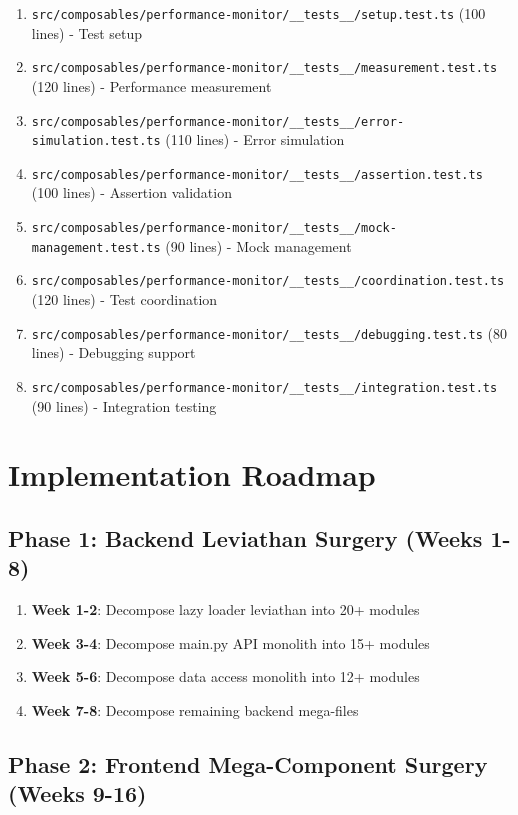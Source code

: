 \documentclass[11pt]{article}
\begin{document}
\begin{enumerate}
\item \texttt{src/composables/performance-monitor/\_\_tests\_\_/setup.test.ts} (100 lines) - Test setup
\item \texttt{src/composables/performance-monitor/\_\_tests\_\_/measurement.test.ts} (120 lines) - Performance measurement
\item \texttt{src/composables/performance-monitor/\_\_tests\_\_/error-simulation.test.ts} (110 lines) - Error simulation
\item \texttt{src/composables/performance-monitor/\_\_tests\_\_/assertion.test.ts} (100 lines) - Assertion validation
\item \texttt{src/composables/performance-monitor/\_\_tests\_\_/mock-management.test.ts} (90 lines) - Mock management
\item \texttt{src/composables/performance-monitor/\_\_tests\_\_/coordination.test.ts} (120 lines) - Test coordination
\item \texttt{src/composables/performance-monitor/\_\_tests\_\_/debugging.test.ts} (80 lines) - Debugging support
\item \texttt{src/composables/performance-monitor/\_\_tests\_\_/integration.test.ts} (90 lines) - Integration testing
\end{enumerate}

\section{Implementation Roadmap}

\subsection{Phase 1: Backend Leviathan Surgery (Weeks 1-8)}

\begin{enumerate}
\item \textbf{Week 1-2}: Decompose lazy loader leviathan into 20+ modules
\item \textbf{Week 3-4}: Decompose main.py API monolith into 15+ modules
\item \textbf{Week 5-6}: Decompose data access monolith into 12+ modules
\item \textbf{Week 7-8}: Decompose remaining backend mega-files
\end{enumerate}

\subsection{Phase 2: Frontend Mega-Component Surgery (Weeks 9-16)}
\end{document}
